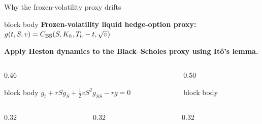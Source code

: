 
\begin{frame}[t]{Why the frozen-volatility proxy drifts}
  \begin{beamercolorbox}[rounded=true,sep=0.11cm]{block body}
    \centering
    {\small\textbf{Frozen-volatility liquid hedge-option proxy:}\quad
    \(g(t,S,v)=C_{\mathrm{BS}}\!\left(S,K_h,T_h-t,\sqrt v\right)\)}
  \end{beamercolorbox}
  \vspace{0.10cm}
  {\scriptsize\bfseries Apply Heston dynamics to the Black--Scholes proxy using Itô's lemma.\par}
  \vspace{0.10cm}
  \begin{columns}[T,onlytextwidth]
    \begin{column}{0.46\textwidth}
      \vspace{0.07cm}
      \begin{beamercolorbox}[rounded=true,sep=0.16cm,wd=0.98\linewidth]{block body}
        \centering\(\displaystyle g_t+rSg_S+\frac12vS^2g_{SS}-rg=0\)
      \end{beamercolorbox}
    \end{column}
    \begin{column}{0.50\textwidth}
      \vspace{0.07cm}
      \begin{beamercolorbox}[rounded=true,sep=0.16cm,wd=0.98\linewidth]{block body}
      \end{beamercolorbox}
    \end{column}
  \end{columns}
  \vspace{0.14cm}
  \begin{columns}[T,onlytextwidth]
    \begin{column}{0.32\textwidth}
      \centering{}
    \end{column}
    \begin{column}{0.32\textwidth}
      \centering{}
    \end{column}
    \begin{column}{0.32\textwidth}

\end{column}
\end{columns}
\end{frame}
